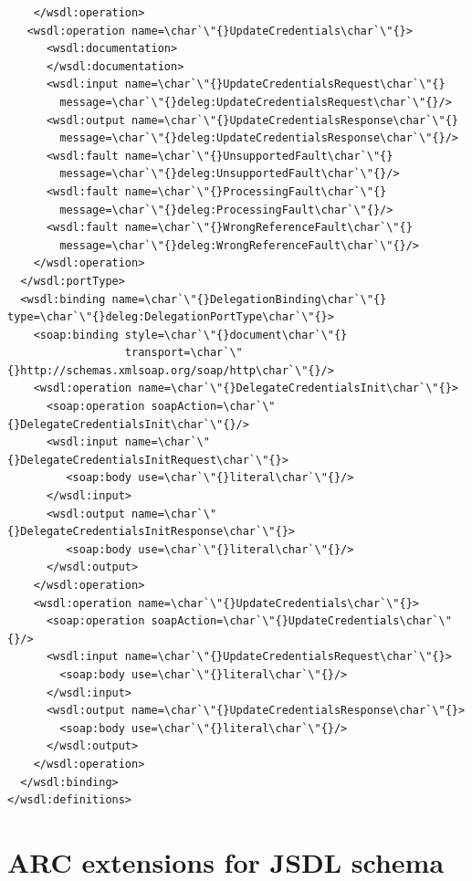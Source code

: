 \documentclass{article}                            %
\begin{document}
\begin{footnotesize}
\begin{verbatim}
    </wsdl:operation>
   <wsdl:operation name=\char`\"{}UpdateCredentials\char`\"{}>
      <wsdl:documentation>
      </wsdl:documentation>
      <wsdl:input name=\char`\"{}UpdateCredentialsRequest\char`\"{}
        message=\char`\"{}deleg:UpdateCredentialsRequest\char`\"{}/>
      <wsdl:output name=\char`\"{}UpdateCredentialsResponse\char`\"{}
        message=\char`\"{}deleg:UpdateCredentialsResponse\char`\"{}/>
      <wsdl:fault name=\char`\"{}UnsupportedFault\char`\"{}
        message=\char`\"{}deleg:UnsupportedFault\char`\"{}/>
      <wsdl:fault name=\char`\"{}ProcessingFault\char`\"{}
        message=\char`\"{}deleg:ProcessingFault\char`\"{}/>
      <wsdl:fault name=\char`\"{}WrongReferenceFault\char`\"{}
        message=\char`\"{}deleg:WrongReferenceFault\char`\"{}/>
    </wsdl:operation>
  </wsdl:portType>
  <wsdl:binding name=\char`\"{}DelegationBinding\char`\"{} type=\char`\"{}deleg:DelegationPortType\char`\"{}>
    <soap:binding style=\char`\"{}document\char`\"{}
                  transport=\char`\"{}http://schemas.xmlsoap.org/soap/http\char`\"{}/>
    <wsdl:operation name=\char`\"{}DelegateCredentialsInit\char`\"{}>
      <soap:operation soapAction=\char`\"{}DelegateCredentialsInit\char`\"{}/>
      <wsdl:input name=\char`\"{}DelegateCredentialsInitRequest\char`\"{}>
         <soap:body use=\char`\"{}literal\char`\"{}/>
      </wsdl:input>
      <wsdl:output name=\char`\"{}DelegateCredentialsInitResponse\char`\"{}>
         <soap:body use=\char`\"{}literal\char`\"{}/>
      </wsdl:output>
    </wsdl:operation>
    <wsdl:operation name=\char`\"{}UpdateCredentials\char`\"{}>
      <soap:operation soapAction=\char`\"{}UpdateCredentials\char`\"{}/>
      <wsdl:input name=\char`\"{}UpdateCredentialsRequest\char`\"{}>
        <soap:body use=\char`\"{}literal\char`\"{}/>
      </wsdl:input>
      <wsdl:output name=\char`\"{}UpdateCredentialsResponse\char`\"{}>
        <soap:body use=\char`\"{}literal\char`\"{}/>
      </wsdl:output>
    </wsdl:operation>
  </wsdl:binding>
</wsdl:definitions>
\end{verbatim}
\end{footnotesize}

\section{ARC extensions for JSDL schema\label{annex:jsdl-extension}}
\end{document}
